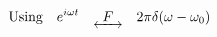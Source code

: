 \documentclass[preview]{standalone}
\begin{document}
\begin{align*}
\textrm{Using}& \quad e^{i\omega t} \quad \underleftrightarrow{ \ \ F \ \ } \quad 2\pi \delta(\omega - \omega_{0}) \\
\end{align*}
\end{document}
